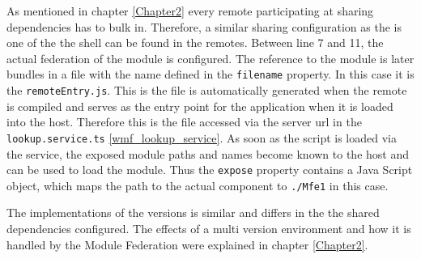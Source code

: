 As mentioned in chapter \ref{Chapter2} every remote participating at sharing dependencies has to bulk in. Therefore, a similar sharing configuration as the is one of the the shell can be found in the remotes. 
Between line 7 and 11, the actual federation of the module is configured. The reference to the module is later bundles in a file with the name defined in the \texttt{filename} property. In this case it is the \texttt{remoteEntry.js}.
This is the file is automatically generated when the remote is compiled and serves as the entry point for the application when it is loaded into the host. Therefore this is the file accessed via the server url in the \texttt{lookup.service.ts} \ref{wmf_lookup_service}.
As soon as the script is loaded via the service, the exposed module paths and names become known to the host and can be used to load the module. Thus the \texttt{expose} property contains a Java Script object, which maps the path to the actual component to \texttt{./Mfe1} in this case.\cite{wmf_concepts}

The implementations of the versions is similar and differs in the the shared dependencies configured. The effects of a multi version environment and how it is handled by the Module Federation were explained in chapter \ref{Chapter2}.